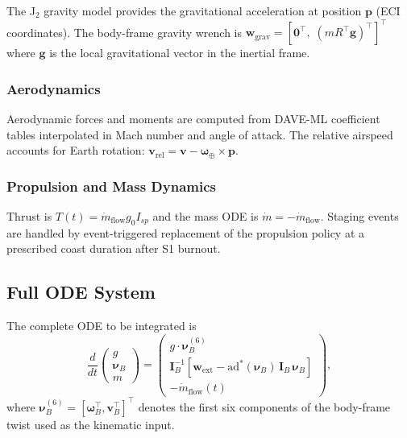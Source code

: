 \documentclass[a4paper,10pt]{article}
\newcommand{\ad}{\mathrm{ad}}
\newcommand{\nuB}{\boldsymbol{\nu}_B}
\newcommand{\omB}{\boldsymbol{\omega}_B}
\newcommand{\vB}{\mathbf{v}_B}
\newcommand{\IB}{\mathbf{I}_B}
\newcommand{\wext}{\mathbf{w}_{\mathrm{ext}}}
\theoremstyle{definition}
\begin{document}
The J$_2$ gravity model provides the gravitational acceleration at position
$\mathbf{p}$ (ECI coordinates).  The body-frame gravity wrench is
$\mathbf{w}_{\mathrm{grav}} = [{\mathbf{0}}^\top,\; (mR^\top \mathbf{g})^\top]^\top$
where $\mathbf{g}$ is the local gravitational vector in the inertial frame.

\subsubsection{Aerodynamics}

Aerodynamic forces and moments are computed from DAVE-ML coefficient tables
interpolated in Mach number and angle of attack.  The relative airspeed
accounts for Earth rotation:
$\mathbf{v}_{\mathrm{rel}} = \mathbf{v} - \boldsymbol{\omega}_\oplus \times \mathbf{p}$.

\subsubsection{Propulsion and Mass Dynamics}

Thrust is $T(t) = \dot{m}_{\mathrm{flow}} g_0 I_{sp}$ and the mass ODE is
$\dot{m} = -\dot{m}_{\mathrm{flow}}$.  Staging events are handled by
event-triggered replacement of the propulsion policy at a prescribed coast
duration after S1 burnout.

\subsection{Full ODE System}

The complete ODE to be integrated is
\begin{equation}
  \frac{d}{dt}
  \begin{pmatrix} g \\ \nuB \\ m \end{pmatrix}
  =
  \begin{pmatrix}
    g \cdot \nuB^{(6)}\\[2pt]
    \IB^{-1}[\wext - \ad^*(\nuB)\,\IB\,\nuB]\\[2pt]
    -\dot{m}_{\mathrm{flow}}(t)
  \end{pmatrix},
  \label{eq:full_ode}
\end{equation}
where $\nuB^{(6)} = [\omB^\top, \vB^\top]^\top$ denotes the first six
components of the body-frame twist used as the kinematic input.

\end{document}
